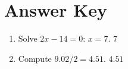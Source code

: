 \documentclass[12pt]{article}
\begin{document}
\section*{Answer Key}

\begin{enumerate}
  \item Solve $2x - 14 = 0$: $x = 7$. $\boxed{7}$
  \item Compute $9.02 / 2 = 4.51$. $\boxed{4.51}$
\end{enumerate}
\end{document}
